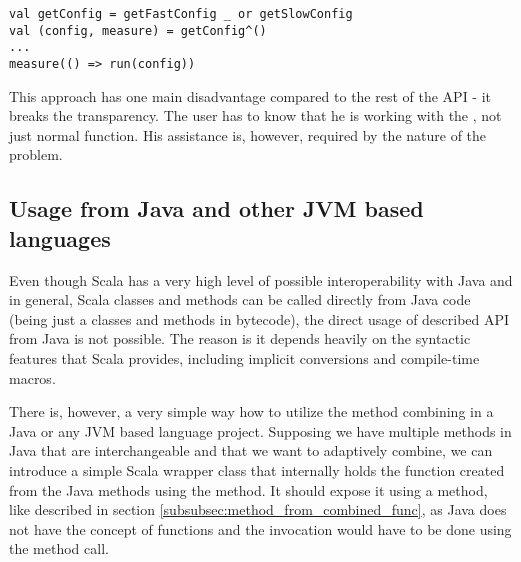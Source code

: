 \lstset{style=Scala}
\begin{lstlisting}
val getConfig = getFastConfig _ or getSlowConfig
val (config, measure) = getConfig^()
...
measure(() => run(config))
\end{lstlisting}

This approach has one main disadvantage compared to the rest of the API - it breaks the transparency. The user has to know that he is working with the , not just normal function. His assistance is, however, required by the nature of the problem.


\subsection{Usage from Java and other JVM based languages}
\label{subsec:usage_from_java}

Even though Scala has a very high level of possible interoperability with Java and in general, Scala classes and methods can be called directly from Java code (being just a classes and methods in bytecode), the direct usage of described API from Java is not possible. The reason is it depends heavily on the syntactic features that Scala provides, including implicit conversions and compile-time macros.

There is, however, a very simple way how to utilize the method combining in a Java or any JVM based language project. Supposing we have multiple methods in Java that are interchangeable and that we want to adaptively combine, we can introduce a simple Scala wrapper class that internally holds the function created from the Java methods using the  method. It should expose it using a method, like described in section \ref{subsubsec:method_from_combined_func}, as Java does not have the concept of functions and the invocation would have to be done using the  method call.

